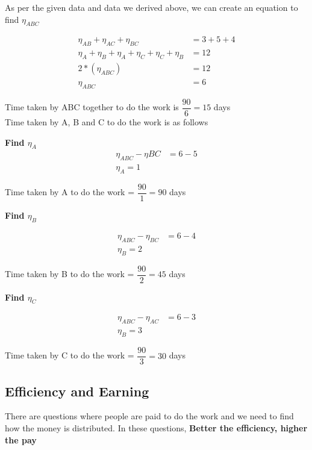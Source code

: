 As per the given data and data we derived above, we can create an equation to find $\eta_{ABC}$

\begin{align*}
    \eta_{AB} + \eta_{AC} + \eta_{BC} &= 3 + 5 + 4 \\
    \eta_A + \eta_B + \eta_A + \eta_C + \eta_C + \eta_B &= 12 \\
    2 * (\eta_{ABC}) &= 12 \\
    \eta_{ABC} &= 6
\end{align*}

Time taken by ABC together to do the work is $\dfrac{90}{6} = 15$ days \\

Time taken by A, B and C to do the work is as follows

\begin{multicols}{3}
    \textbf{Find $\eta_A$}
    \begin{align*}
        \eta_{ABC} - \eta{BC} &= 6 - 5 \\
        \eta_A = 1
    \end{align*}

    Time taken by A to do the work = $\dfrac{90}{1} = 90$ days

    \columnbreak

    \textbf{Find $\eta_B$}

    \begin{align*}
        \eta_{ABC} - \eta_{BC} &= 6 - 4 \\
        \eta_B = 2
    \end{align*}

    Time taken by B to do the work = $\dfrac{90}{2} = 45$ days

    \columnbreak

    \textbf{Find $\eta_C$}

    \begin{align*}
        \eta_{ABC} - \eta_{AC} &= 6 - 3 \\
        \eta_B = 3
    \end{align*}

    Time taken by C to do the work = $\dfrac{90}{3} = 30$ days

\end{multicols}

\subsection{Efficiency and Earning}
There are questions where people are paid to do the work and we need to find how the money is distributed. In these questions, \textbf{Better the efficiency, higher the pay}

